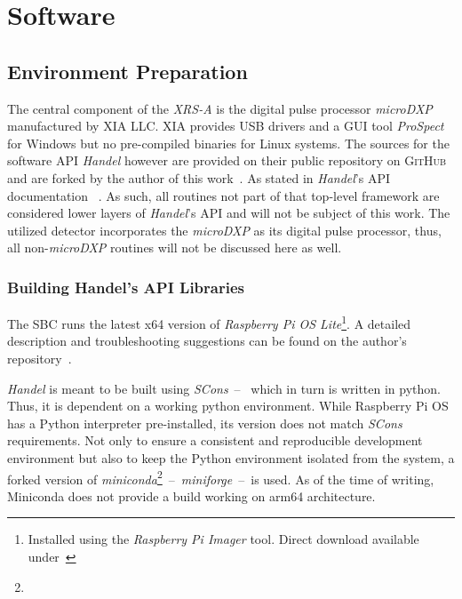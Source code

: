 \chapter{Software}\label{chap:software}
    \section{Environment Preparation}\label{sec:env preperation}
        The central component of the \textit{XRS-A} is the digital pulse processor \textit{microDXP} manufactured by \textsc{XIA LLC}.
        \textsc{XIA} provides USB drivers and a GUI tool \textit{ProSpect} for Windows but no pre-compiled binaries for Linux systems.
        The sources for the software API \textit{Handel} however are provided on their public repository on \textsc{GitHub}~\cite{Software.HandelRelease.2023} and are forked by the author of this work~\cite{Software.XraythesisHandel.2023}.
        As stated in \textit{Handel}'s API documentation ~\cite{Manual.HandelAPIManual.Xiang}.
        As such, all routines not part of that top-level framework are considered lower layers of \textit{Handel}'s API and will not be subject of this work.
        The utilized detector incorporates the \textit{microDXP} as its digital pulse processor, thus, all non-\textit{microDXP} routines will not be discussed here as well.\par\medskip

        \subsection{Building Handel's API Libraries}\label{sec:software preperations}
            The SBC runs the latest x64 version of \textit{Raspberry Pi OS Lite}\footnote{Installed using the \textit{Raspberry Pi Imager} tool.
            Direct download available under~\cite{Software.RaspberryPiOSLite.2023}}.
            A detailed description and troubleshooting suggestions can be found on the author's repository~\cite{Software.XraythesisHandel.2023}.\par\medskip

            \textit{Handel} is meant to be built using \textit{SCons}~--~ which in turn is written in python.
            Thus, it is dependent on a working python environment.
            While Raspberry Pi OS has a Python interpreter pre-installed, its version does not match \textit{SCons} requirements.
            Not only to ensure a consistent and reproducible development environment but also to keep the Python environment isolated from the system, a forked version of \textit{miniconda}\footnote{}~--~\textit{miniforge}~--~is used.
            As of the time of writing, Miniconda does not provide a build working on arm64 architecture.


